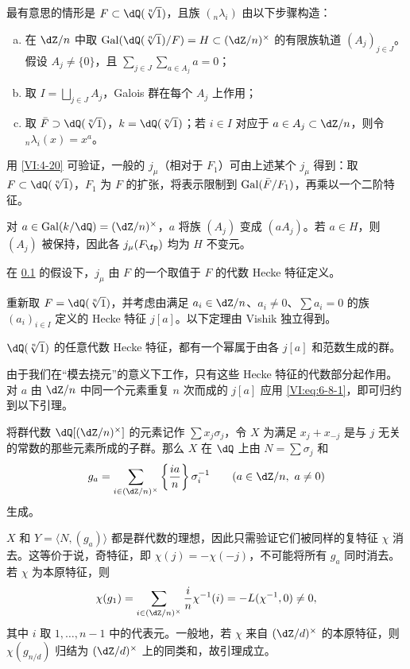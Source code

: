 \subsection{}\label{VI:6-9}
最有意思的情形是 $F\subset\dQ(\sqrt[n]{1})$，且族 $({}_n\lambda_i)$ 由以下步骤构造：
\begin{enumerate}[a)]
\item 在 $\dZ/n$ 中取 $\gal(\dQ(\sqrt[n]{1})/F)=H\subset(\dZ/n)^\times$ 的有限族轨道 $(A_j)_{j\in J}$。假设 $A_j\ne\{0\}$，且 $\sum_{j\in J}\sum_{a\in A_j}a=0$；
\item 取 $I=\bigsqcup_{j\in J}A_j$，Galois 群在每个 $A_j$ 上作用；
\item 取 $\bar F\supset\dQ(\sqrt[n]{1})$，$k=\dQ(\sqrt[n]{1})$；若 $i\in I$ 对应于 $a\in A_j\subset\dZ/n$，则令 ${}_n\lambda_i(x)=x^a$。
\end{enumerate}
用 \ref{VI:4-20} 可验证，一般的 $j_\mu$（相对于 $F_1$）可由上述某个 $j_\mu$ 得到：取 $F\subset\dQ(\sqrt[n]{1})$，$F_1$ 为 $F$ 的扩张，将表示限制到 $\operatorname{Gal}(\bar F/F_1)$，再乘以一个二阶特征。

对 $a\in\gal(k/\dQ)=(\dZ/n)^\times$，$a$ 将族 $(A_j)$ 变成 $(aA_j)$。若 $a\in H$，则 $(A_j)$ 被保持，因此各 $j_\mu(F_\fp)$ 均为 $H$ 不变元。

\begin{proposition_}\label{VI:6-10}
在 \ref{VI:6-9} 的假设下，$j_\mu$ 由 $F$ 的一个取值于 $F$ 的代数 Hecke 特征定义。
\end{proposition_}
重新取 $F=\dQ(\sqrt[n]{1})$，并考虑由满足 $a_i\in\dZ/n$、$a_i\ne0$、$\sum a_i=0$ 的族 $(a_i)_{i\in I}$ 定义的 Hecke 特征 $j[a]$。以下定理由 Vishik 独立得到。

\begin{theorem_}\label{VI:6-11}
$\dQ(\sqrt[n]{1})$ 的任意代数 Hecke 特征，都有一个幂属于由各 $j[a]$ 和范数生成的群。
\end{theorem_}
由于我们在“模去挠元”的意义下工作，只有这些 Hecke 特征的代数部分起作用。对 $a$ 由 $\dZ/n$ 中同一个元素重复 $n$ 次而成的 $j[a]$ 应用 \eqref{VI:eq:6-8-1}，即可归约到以下引理。

\begin{lemma_}\label{VI:6-12}
将群代数 $\dQ[(\dZ/n)^\times]$ 的元素记作 $\sum x_j\sigma_j$，令 $X$ 为满足 $x_j+x_{-j}$ 是与 $j$ 无关的常数的那些元素所成的子群。那么 $X$ 在 $\dQ$ 上由 $N=\sum\sigma_j$ 和
\[g_a=\sum_{i\in(\dZ/n)^\times}\left\{\frac{ia}{n}\right\}\sigma_i^{-1}
\qquad(a\in\dZ/n,\ a\ne0)\]
生成。
\end{lemma_}
$X$ 和 $Y=\langle N,(g_a)\rangle$ 都是群代数的理想，因此只需验证它们被同样的复特征 $\chi$ 消去。这等价于说，奇特征，即 $\chi(j)=-\chi(-j)$，不可能将所有 $g_a$ 同时消去。若 $\chi$ 为本原特征，则
\[\chi(g_1)=\sum_{i\in(\dZ/n)^\times}\frac{i}{n}\chi^{-1}(i)
=-L(\chi^{-1},0)\ne0,\]
其中 $i$ 取 $1,\ldots,n-1$ 中的代表元。一般地，若 $\chi$ 来自 $(\dZ/d)^\times$ 的本原特征，则 $\chi(g_{n/d})$ 归结为 $(\dZ/d)^\times$ 上的同类和，故引理成立。

